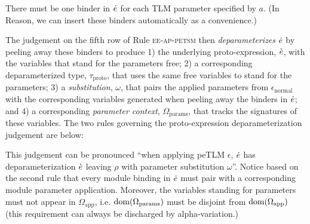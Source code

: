 \documentclass[acmsmall,review,anonymous]{acmart}\settopmatter{printfolios=true,printccs=false,printacmref=false}
\begin{document}
\vspace{-4px}{\small\[\begin{array}{llcl}
\mathsf{PPrExp} & \pce & ::= & \apceexp{\ce} ~\vert~ \apcebindmod{X}{\pce}
\end{array}\]}%
\vspace{-6px}%

There must be one binder in $\pce$ for each TLM parameter specified by $a$. (In Reason, we can insert these binders automatically as a convenience.) 

The judgement on the fifth row of Rule \textsc{ee-ap-petsm} then \emph{deparameterizes} $\pce$ by peeling away these binders to produce 1) the underlying proto-expression, $\ce$, with the variables that stand for the parameters free; 2) a corresponding deparameterized type, $\tau_\text{proto}$, that uses the same free variables to stand for the parameters; 3) a \emph{substitution}, $\omega$, that pairs the applied parameters from $\epsilon_\text{normal}$ with the corresponding variables generated when peeling away the binders in $\pce$; and 4) a corresponding \emph{parameter context}, $\Omega_\text{params}$, that tracks the signatures of these variables. The two rules governing the proto-expression deparameterization judgement are below:
{\small\begin{mathpar}

\vspace{-4px}
\end{mathpar}}%
This judgement can be pronounced ``when applying peTLM $\epsilon$, $\pce$ has deparameterization $\ce$ leaving $\rho$ with parameter substitution $\omega$''. 
Notice based on the second rule that every module binding in $\pce$ must pair with a corresponding module parameter application. Moreover, the variables standing for parameters must not appear in $\Omega_\text{app}$, i.e. $\domof{\Omega_\text{params}}$ must be disjoint from $\domof{\Omega_\text{app}}$ (this requirement can always be discharged by alpha-variation.)
\end{document}
